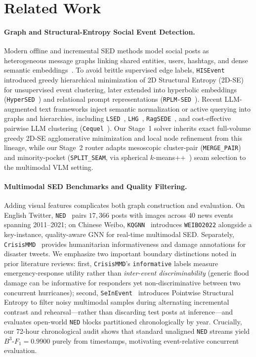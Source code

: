 \section{Related Work}
\label{sec:related}

\paragraph{Graph and Structural-Entropy Social Event Detection.}
Modern offline and incremental SED methods model social posts as heterogeneous message graphs linking shared entities, users, hashtags, and dense semantic embeddings~\cite{cao2021kpgnn,reimers2019sentence}. To avoid brittle supervised edge labels, \texttt{HISEvent}~\cite{cao2024hisevent} introduced greedy hierarchical minimization of 2D Structural Entropy (2D-SE)~\cite{li2016structural} for unsupervised event clustering, later extended into hyperbolic embeddings (\texttt{HyperSED}~\cite{yu2025hypersed}) and relational prompt representations (\texttt{RPLM-SED}~\cite{li2024rplmsed}). Recent LLM-augmented text frameworks inject semantic normalization or active querying into graphs and hierarchies, including \texttt{LSED}~\cite{qiu2025lsed}, \texttt{LHG}~\cite{qiu2026lhg}, \texttt{RagSEDE}~\cite{liu2026ragsede}, and cost-effective pairwise LLM clustering (\texttt{Cequel}~\cite{wang2025cequel}). Our Stage~1 solver inherits exact full-volume greedy 2D-SE agglomerative minimization and local node refinement from this lineage, while our Stage~2 router adapts mesoscopic cluster-pair (\texttt{MERGE\_PAIR}) and minority-pocket (\texttt{SPLIT\_SEAM}, via spherical $k$-means++~\cite{arthur2007kmeanspp}) seam selection to the multimodal VLM setting.

\paragraph{Multimodal SED Benchmarks and Quality Filtering.}
Adding visual features complicates both graph construction and evaluation. On English Twitter, \texttt{NED}~\cite{lin2024ned} pairs $17{,}366$ posts with images across $40$ news events spanning 2011--2021; on Chinese Weibo, \texttt{KQGNN}~\cite{han2026kqgnn} introduces \texttt{WEIBO2022} alongside a key-instance, quality-aware GNN for real-time multimodal SED. Separately, \texttt{CrisisMMD}~\cite{alam2018crisismmd} provides humanitarian informativeness and damage annotations for disaster tweets. We emphasize two important boundary distinctions noted in prior literature reviews: first, \texttt{CrisisMMD}'s \texttt{informative} labels measure emergency-response utility rather than \emph{inter-event discriminability} (generic flood damage can be informative for responders yet non-discriminative between two concurrent hurricanes); second, \texttt{SeInEvent}~\cite{yang2026seinevent} introduces Pointwise Structural Entropy to filter noisy multimodal samples during alternating incremental contrast and rehearsal---rather than discarding test posts at inference---and evaluates open-world \texttt{NED} blocks partitioned chronologically by year. Crucially, our 72-hour chronological audit shows that standard unaligned \texttt{NED} streams yield $B^3\text{-}F_1 = 0.9900$ purely from timestamps, motivating event-relative concurrent evaluation.

